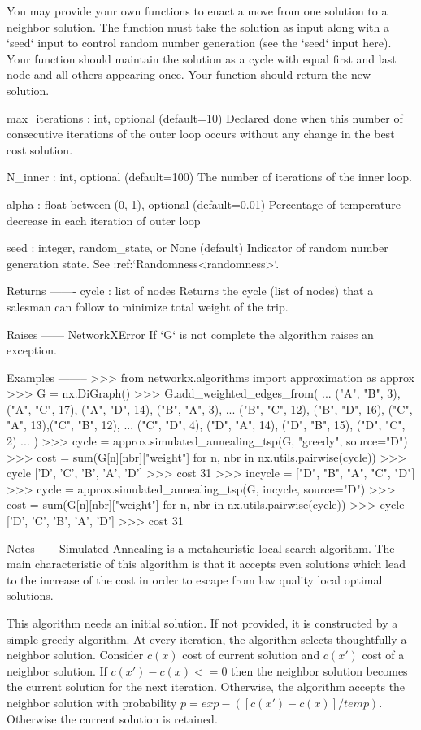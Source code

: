 \begin{DoxyVerb}
    You may provide your own functions to enact a move from
    one solution to a neighbor solution. The function must take
    the solution as input along with a `seed` input to control
    random number generation (see the `seed` input here).
    Your function should maintain the solution as a cycle with
    equal first and last node and all others appearing once.
    Your function should return the new solution.

max_iterations : int, optional (default=10)
    Declared done when this number of consecutive iterations of
    the outer loop occurs without any change in the best cost solution.

N_inner : int, optional (default=100)
    The number of iterations of the inner loop.

alpha : float between (0, 1), optional (default=0.01)
    Percentage of temperature decrease in each iteration
    of outer loop

seed : integer, random_state, or None (default)
    Indicator of random number generation state.
    See :ref:`Randomness<randomness>`.

Returns
-------
cycle : list of nodes
    Returns the cycle (list of nodes) that a salesman
    can follow to minimize total weight of the trip.

Raises
------
NetworkXError
    If `G` is not complete the algorithm raises an exception.

Examples
--------
>>> from networkx.algorithms import approximation as approx
>>> G = nx.DiGraph()
>>> G.add_weighted_edges_from({
...     ("A", "B", 3), ("A", "C", 17), ("A", "D", 14), ("B", "A", 3),
...     ("B", "C", 12), ("B", "D", 16), ("C", "A", 13),("C", "B", 12),
...     ("C", "D", 4), ("D", "A", 14), ("D", "B", 15), ("D", "C", 2)
... })
>>> cycle = approx.simulated_annealing_tsp(G, "greedy", source="D")
>>> cost = sum(G[n][nbr]["weight"] for n, nbr in nx.utils.pairwise(cycle))
>>> cycle
['D', 'C', 'B', 'A', 'D']
>>> cost
31
>>> incycle = ["D", "B", "A", "C", "D"]
>>> cycle = approx.simulated_annealing_tsp(G, incycle, source="D")
>>> cost = sum(G[n][nbr]["weight"] for n, nbr in nx.utils.pairwise(cycle))
>>> cycle
['D', 'C', 'B', 'A', 'D']
>>> cost
31

Notes
-----
Simulated Annealing is a metaheuristic local search algorithm.
The main characteristic of this algorithm is that it accepts
even solutions which lead to the increase of the cost in order
to escape from low quality local optimal solutions.

This algorithm needs an initial solution. If not provided, it is
constructed by a simple greedy algorithm. At every iteration, the
algorithm selects thoughtfully a neighbor solution.
Consider $c(x)$ cost of current solution and $c(x')$ cost of a
neighbor solution.
If $c(x') - c(x) <= 0$ then the neighbor solution becomes the current
solution for the next iteration. Otherwise, the algorithm accepts
the neighbor solution with probability $p = exp - ([c(x') - c(x)] / temp)$.
Otherwise the current solution is retained.


\end{DoxyVerb}

